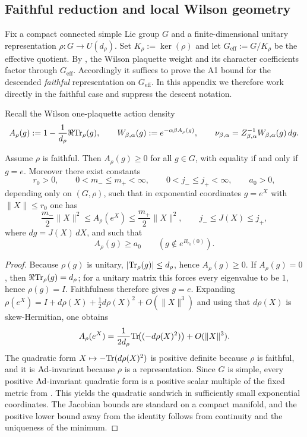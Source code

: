 \subsection{Faithful reduction and local Wilson geometry}

Fix a compact connected simple Lie group $G$ and a finite-dimensional unitary representation $\rho:G\to U(d_\rho)$.
Set $K_\rho:=\ker(\rho)$ and let $G_{\mathrm{eff}}:=G/K_\rho$ be the effective quotient.
By , the Wilson plaquette weight and its character coefficients factor through $G_{\mathrm{eff}}$.
Accordingly it suffices to prove the A1 bound for the descended \emph{faithful} representation on $G_{\mathrm{eff}}$.
In this appendix we therefore work directly in the faithful case and suppress the descent notation.

Recall the Wilson one-plaquette action density
\[
A_\rho(g):=1-\frac{1}{d_\rho}\Re\mathrm{Tr}_\rho(g),
\qquad
W_{\beta,\alpha}(g):=e^{-\alpha\beta A_\rho(g)},
\qquad
\nu_{\beta,\alpha}=Z_{\beta,\alpha}^{-1}W_{\beta,\alpha}(g)\,dg.
\]

\begin{lemma}\label{lem:A1_compact_simple_local_geom}
Assume $\rho$ is faithful.
Then $A_\rho(g)\ge 0$ for all $g\in G$, with equality if and only if $g=e$.
Moreover there exist constants
\[
r_0>0,
\qquad
0<m_-\le m_+<\infty,
\qquad
0<j_-\le j_+<\infty,
\qquad
a_0>0,
\]
depending only on $(G,\rho)$, such that in exponential coordinates $g=e^X$ with $\|X\|\le r_0$ one has
\begin{equation}\label{eq:A1_local_quad_sandwich}
\frac{m_-}{2}\|X\|^2\le A_\rho(e^X)\le \frac{m_+}{2}\|X\|^2,
\qquad
j_-\le J(X)\le j_+,
\end{equation}
where $dg=J(X)\,dX$, and such that
\begin{equation}\label{eq:A1_local_outside_gap}
A_\rho(g)\ge a_0\qquad (g\notin e^{B_{r_0}(0)}).
\end{equation}
\end{lemma}

\begin{proof}
Because $\rho(g)$ is unitary, $|\mathrm{Tr}_\rho(g)|\le d_\rho$, hence $A_\rho(g)\ge 0$.
If $A_\rho(g)=0$, then $\Re\mathrm{Tr}_\rho(g)=d_\rho$; for a unitary matrix this forces every eigenvalue to be $1$, hence $\rho(g)=I$.
Faithfulness therefore gives $g=e$.
Expanding $\rho(e^X)=I+d\rho(X)+\tfrac12 d\rho(X)^2+O(\|X\|^3)$ and using that $d\rho(X)$ is skew-Hermitian, one obtains
\[
A_\rho(e^X)=\frac{1}{2d_\rho}\mathrm{Tr}\!\bigl((-d\rho(X)^2)\bigr)+O(\|X\|^3).
\]
The quadratic form $X\mapsto -\mathrm{Tr}(d\rho(X)^2)$ is positive definite because $\rho$ is faithful, and it is $\operatorname{Ad}$-invariant because $\rho$ is a representation.
Since $G$ is simple, every positive $\operatorname{Ad}$-invariant quadratic form is a positive scalar multiple of the fixed metric from .
This yields the quadratic sandwich in sufficiently small exponential coordinates.
The Jacobian bounds are standard on a compact manifold, and the positive lower bound away from the identity follows from continuity and the uniqueness of the minimum.
\end{proof}

